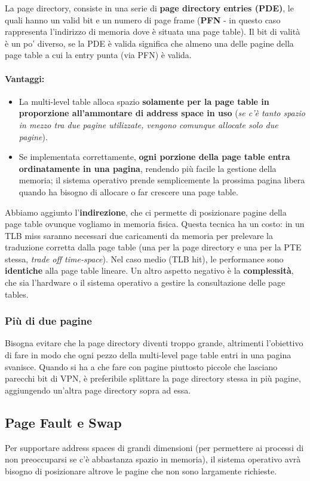 \documentclass[12pt, letterpaper]{article}
\begin{document}
				La page directory, consiste in una serie di \textbf{page directory entries (PDE)}, le quali hanno un valid bit e un numero di page frame (\textbf{PFN} - in questo caso rappresenta l'indirizzo di memoria dove è situata una page table). Il bit di valità è un po' diverso, se la PDE è valida significa che almeno una delle pagine della page table a cui la entry punta (via PFN) è valida. 
				\paragraph{Vantaggi:}
				\begin{itemize}
					\item La multi-level table alloca spazio \textbf{solamente per la page table in proporzione all'ammontare di address space in uso} (\textit{se c'è tanto spazio in mezzo tra due pagine utilizzate, vengono comunque allocate solo due pagine}). 
					\item Se implementata correttamente, \textbf{ogni porzione della page table entra ordinatamente in una pagina}, rendendo più facile la gestione della memoria; il sistema operativo prende semplicemente la prossima pagina libera quando ha bisogno di allocare o far crescere una page table.
				\end{itemize}
				Abbiamo aggiunto l'\textbf{indirezione}, che ci permette di posizionare pagine della page table ovunque vogliamo in memoria fisica. Questa tecnica ha un costo: in un TLB miss saranno necessari due caricamenti da memoria per prelevare la traduzione corretta dalla page table (una per la page directory e una per la PTE stessa, \textit{trade off time-space}). Nel caso medio (TLB hit), le performance sono \textbf{identiche }alla page table lineare. Un altro aspetto negativo è la \textbf{complessità}, che sia l'hardware o il sistema operativo a gestire la consultazione delle page tables.
			
			\subsubsection{Più di due pagine}
				Bisogna evitare che la page directory diventi troppo grande, altrimenti l'obiettivo di fare in modo che ogni pezzo della multi-level page table entri in una pagina svanisce. Quando si ha a che fare con pagine piuttosto piccole che lasciano parecchi bit di VPN, è preferibile splittare la page directory stessa in più pagine, aggiungendo un'altra page directory sopra ad essa. 
				
		\subsection{Page Fault e Swap}
			Per supportare address spaces di grandi dimensioni (per permettere ai processi di non preoccuparsi se c'è abbastanza spazio in memoria), il sistema operativo avrà bisogno di posizionare altrove le pagine che non sono largamente richieste.
			
\end{document}
